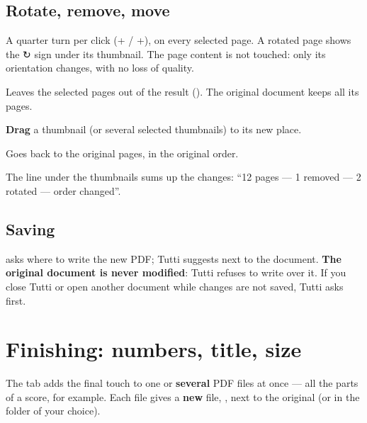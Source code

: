\subsection{Rotate, remove, move}
\begin{description}[style=nextline,leftmargin=5mm,font=\sffamily\bfseries\color{bordeaux}]
\item[↺ Rotate left, ↻ Rotate right]
A quarter turn per click (+ / +), on every selected
page. A rotated page shows the ↻ sign under its thumbnail. The page content is not touched: only its
orientation changes, with no loss of quality.
\item[Remove]
Leaves the selected pages out of the result (). The original document keeps all its pages.
\item[Move]
\textbf{Drag} a thumbnail (or several selected thumbnails) to its new place.
\item[Undo all]
Goes back to the original pages, in the original order.
\end{description}
The line under the thumbnails sums up the changes: “12 pages — 1 removed — 2 rotated — order changed”.

\subsection{Saving}
 asks where to write the new PDF; Tutti suggests 
next to the document. \textbf{The original document is never modified}: Tutti refuses to write over
it. If you close Tutti or open another document while changes are not saved, Tutti asks first.


\section{Finishing: numbers, title, size}\label{sec:finitions}

The  tab adds the final touch to one or \textbf{several} PDF files at once — all the
parts of a score, for example. Each file gives a \textbf{new} file, ,
next to the original (or in the folder of your choice).


